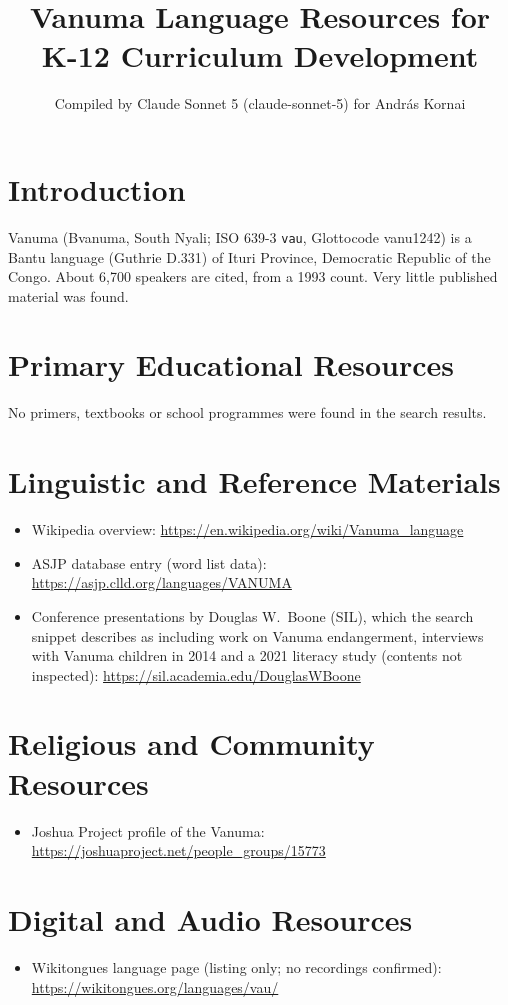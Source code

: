 \documentclass[12pt]{article}
\title{Vanuma Language Resources for K-12 Curriculum Development}
\author{Compiled by Claude Sonnet 5 (claude-sonnet-5) for Andr\'as Kornai}
\date{}
\begin{document}
\maketitle

\section{Introduction}
Vanuma (Bvanuma, South Nyali; ISO 639-3 \texttt{vau}, Glottocode vanu1242) is a Bantu language (Guthrie D.331) of Ituri Province, Democratic Republic of the Congo. About 6,700 speakers are cited, from a 1993 count. Very little published material was found.

\section{Primary Educational Resources}
No primers, textbooks or school programmes were found in the search results.

\section{Linguistic and Reference Materials}
\begin{itemize}
\item Wikipedia overview: \url{https://en.wikipedia.org/wiki/Vanuma_language}
\item ASJP database entry (word list data): \url{https://asjp.clld.org/languages/VANUMA}
\item Conference presentations by Douglas W.\ Boone (SIL), which the search snippet describes as including work on Vanuma endangerment, interviews with Vanuma children in 2014 and a 2021 literacy study (contents not inspected): \url{https://sil.academia.edu/DouglasWBoone}
\end{itemize}

\section{Religious and Community Resources}
\begin{itemize}
\item Joshua Project profile of the Vanuma: \url{https://joshuaproject.net/people_groups/15773}
\end{itemize}

\section{Digital and Audio Resources}
\begin{itemize}
\item Wikitongues language page (listing only; no recordings confirmed): \url{https://wikitongues.org/languages/vau/}
\end{itemize}
\end{document}
